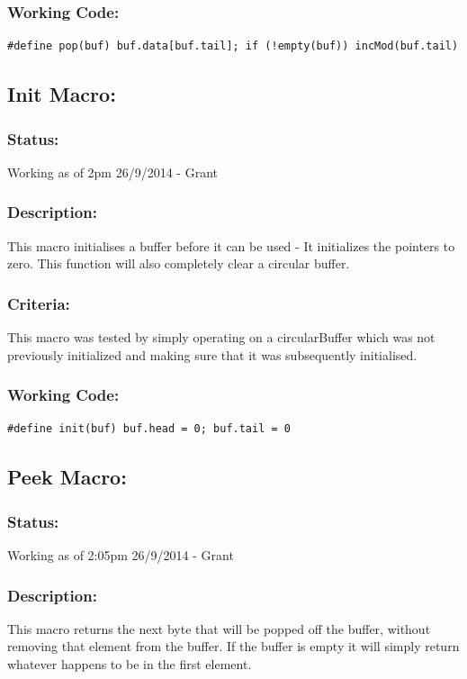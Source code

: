 \documentclass[]{report}
\begin{document}
\subsubsection{Working Code:}
\begin{lstlisting}
#define pop(buf) buf.data[buf.tail]; if (!empty(buf)) incMod(buf.tail)
\end{lstlisting}

\subsection{Init Macro:}
\subsubsection{Status:}
Working as of 2pm 26/9/2014 - Grant

\subsubsection{Description:}
This macro initialises a buffer before it can be used - It initializes the pointers to zero. This function will also completely clear a circular buffer.

\subsubsection{Criteria:}
This macro was tested by simply operating on a circularBuffer which was not previously initialized and making sure that it was subsequently initialised.

\subsubsection{Working Code:}
\begin{lstlisting}
#define init(buf) buf.head = 0; buf.tail = 0
\end{lstlisting}

\subsection{Peek Macro:}
\subsubsection{Status:}
Working as of 2:05pm 26/9/2014 - Grant

\subsubsection{Description:}
This macro returns the next byte that will be popped off the buffer, without removing that element from the buffer. If the buffer is empty it will simply return whatever happens to be in the first element.
\end{document}
